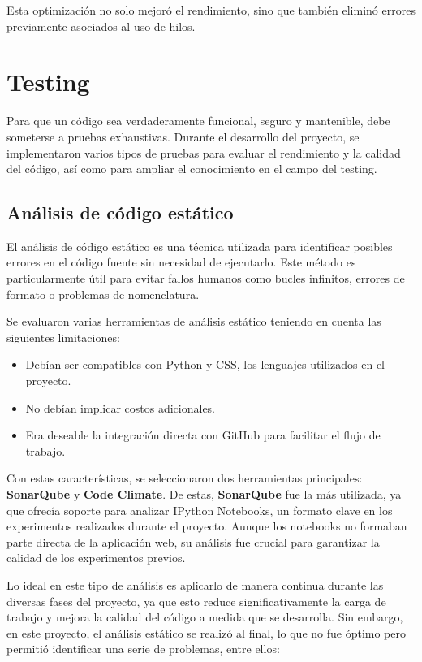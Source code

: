 Esta optimización no solo mejoró el rendimiento, sino que también eliminó errores previamente asociados al uso de hilos.


\section{Testing}

Para que un código sea verdaderamente funcional, seguro y mantenible, debe someterse a pruebas exhaustivas. Durante el desarrollo del proyecto, se implementaron varios tipos de pruebas para evaluar el rendimiento y la calidad del código, así como para ampliar el conocimiento en el campo del testing.

\subsection{Análisis de código estático}

El análisis de código estático es una técnica utilizada para identificar posibles errores en el código fuente sin necesidad de ejecutarlo. Este método es particularmente útil para evitar fallos humanos como bucles infinitos, errores de formato o problemas de nomenclatura.

Se evaluaron varias herramientas de análisis estático teniendo en cuenta las siguientes limitaciones:
\begin{itemize}
    \item Debían ser compatibles con Python y CSS, los lenguajes utilizados en el proyecto.
    \item No debían implicar costos adicionales.
    \item Era deseable la integración directa con GitHub para facilitar el flujo de trabajo.
\end{itemize}

Con estas características, se seleccionaron dos herramientas principales: \textbf{SonarQube} y \textbf{Code Climate}. De estas, \textbf{SonarQube} fue la más utilizada, ya que ofrecía soporte para analizar IPython Notebooks, un formato clave en los experimentos realizados durante el proyecto. Aunque los notebooks no formaban parte directa de la aplicación web, su análisis fue crucial para garantizar la calidad de los experimentos previos.

Lo ideal en este tipo de análisis es aplicarlo de manera continua durante las diversas fases del proyecto, ya que esto reduce significativamente la carga de trabajo y mejora la calidad del código a medida que se desarrolla. Sin embargo, en este proyecto, el análisis estático se realizó al final, lo que no fue óptimo pero permitió identificar una serie de problemas, entre ellos:

